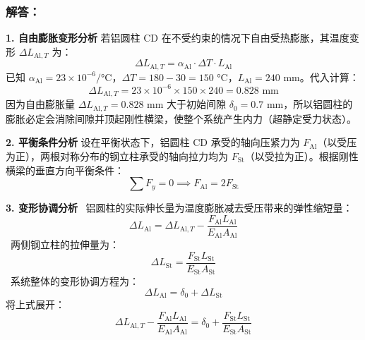 \documentclass[11pt,a4paper]{ctexrep}
\begin{document}
{\begin{center}
\end{center}

\subsubsection*{解答：}

\textbf{1. 自由膨胀变形分析}
若铝圆柱 CD 在不受约束的情况下自由受热膨胀，其温度变形 $\Delta L_{\text{Al}, T}$ 为：
\[
    \Delta L_{\text{Al}, T} = \alpha_{\text{Al}} \cdot \Delta T \cdot L_{\text{Al}}
\]
已知 $\alpha_{\text{Al}} = 23 \times 10^{-6}/\text{°C}$，$\Delta T = 180 - 30 = 150\text{ °C}$，$L_{\text{Al}} = 240\text{ mm}$。代入计算：
\[
    \Delta L_{\text{Al}, T} = 23 \times 10^{-6} \times 150 \times 240 = 0.828\text{ mm}
\]
因为自由膨胀量 $\Delta L_{\text{Al}, T} = 0.828\text{ mm}$ 大于初始间隙 $\delta_0 = 0.7\text{ mm}$，所以铝圆柱的膨胀必定会消除间隙并顶起刚性横梁，使整个系统产生内力（超静定受力状态）。

\textbf{2. 平衡条件分析}
设在平衡状态下，铝圆柱 CD 承受的轴向压紧力为 $F_{\text{Al}}$（以受压为正），两根对称分布的钢立柱承受的轴向拉力均为 $F_{\text{St}}$（以受拉为正）。根据刚性横梁的垂直方向平衡条件：
\[
    \sum F_y = 0 \implies F_{\text{Al}} = 2 F_{\text{St}}
\]

\textbf{3. 变形协调分析}
\noindent\textbullet\ 铝圆柱的实际伸长量为温度膨胀减去受压带来的弹性缩短量：
    \[
        \Delta L_{\text{Al}} = \Delta L_{\text{Al}, T} - \frac{F_{\text{Al}} L_{\text{Al}}}{E_{\text{Al}} A_{\text{Al}}}
    \]
\noindent\textbullet\ 两侧钢立柱的拉伸量为：
    \[
        \Delta L_{\text{St}} = \frac{F_{\text{St}} L_{\text{St}}}{E_{\text{St}} A_{\text{St}}}
    \]
\noindent\textbullet\ 系统整体的变形协调方程为：
    \[
        \Delta L_{\text{Al}} = \delta_0 + \Delta L_{\text{St}}
    \]
    将上式展开：
    \[
        \Delta L_{\text{Al}, T} - \frac{F_{\text{Al}} L_{\text{Al}}}{E_{\text{Al}} A_{\text{Al}}} = \delta_0 + \frac{F_{\text{St}} L_{\text{St}}}{E_{\text{St}} A_{\text{St}}}
    \]

}
\end{document}
